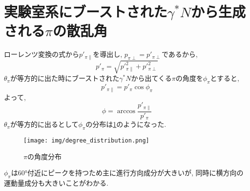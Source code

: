\section{\texorpdfstring{実験室系にブーストされた$\gamma^* N$から生成される$\pi$の散乱角}{LG}}
ローレンツ変換の式から$p'_{\pi \parallel}$を導出し, $p_{\pi \perp} = p'_{\pi \perp}$であるから,
\begin{equation}
    p'_\pi = \sqrt{p'^2_{\pi \parallel} + p'^2_{\pi \perp} }
\end{equation}
$\theta_\pi$が等方的に出た時にブーストされた$\gamma^* N$から出てくる$\pi$の角度を$\phi_\pi$とすると,
\begin{equation}
    p'_{\pi \parallel} = p'_\pi \cos{\phi_\pi}
\end{equation}
よって,
\begin{equation}
    \phi = \arccos{\dfrac{p'_{\pi \parallel}}{p'_\pi}}
\end{equation}
$\theta_\pi$が等方的に出るとして$\phi_\pi$の分布は\ref{fig:angle8}のようになった.
\begin{figure}[H]
    \centering
    \texttt{[image: img/degree\_distribution.png]}
    \caption{$\pi$の角度分布}
    \label{fig:angle8}
\end{figure}
$\phi_\pi$は60°付近にピークを持つため主に進行方向成分が大きいが,
同時に横方向の運動量成分も大きいことがわかる.
